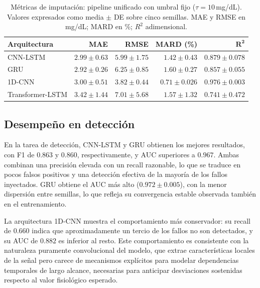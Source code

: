 \documentclass{report}
\begin{document}
\begin{table}[htbp]
\centering
\caption{Métricas de imputación: pipeline unificado con umbral fijo ($\tau = 10$\,mg/dL). Valores expresados como media $\pm$ DE sobre cinco semillas. MAE y RMSE en mg/dL; MARD en \%; $R^2$ adimensional.}
\label{tab:bloque_a_imputacion}
\begin{tabular}{lrrrr}
\toprule
\textbf{Arquitectura} &
\textbf{MAE} & \textbf{RMSE} & \textbf{MARD (\%)} & $\boldsymbol{R^2}$ \\
\midrule
CNN-LSTM         & $2.99 \pm 0.63$ & $5.99 \pm 1.75$ & $1.42 \pm 0.43$
                 & $0.879 \pm 0.078$ \\
GRU              & $2.92 \pm 0.26$ & $6.25 \pm 0.85$ & $1.60 \pm 0.27$
                 & $0.857 \pm 0.055$ \\
1D-CNN           & $3.00 \pm 0.51$ & $3.82 \pm 0.44$ & $0.71 \pm 0.026$
                 & $0.976 \pm 0.003$ \\
Transformer-LSTM & $3.42 \pm 1.44$ & $7.01 \pm 5.68$ & $1.57 \pm 1.32$
                 & $0.741 \pm 0.472$ \\
\bottomrule
\end{tabular}
\end{table}

\subsection*{Desempeño en detección}

En la tarea de detección, CNN-LSTM y GRU obtienen los mejores resultados, con F1 de $0.863$ y $0.860$, respectivamente, y AUC superiores a $0.967$. Ambas combinan una precisión elevada con un recall razonable, lo que se traduce en pocos falsos positivos y una detección efectiva de la mayoría de los fallos inyectados. GRU obtiene el AUC más alto ($0.972 \pm 0.005$), con la menor dispersión entre semillas, lo que refleja su convergencia estable observada también en el entrenamiento.

La arquitectura 1D-CNN muestra el comportamiento más conservador: su recall de $0.660$ indica que aproximadamente un tercio de los fallos no son detectados, y su AUC de $0.882$ es inferior al resto. Este comportamiento es consistente con la naturaleza puramente convolucional del modelo, que extrae características locales de la señal pero carece de mecanismos explícitos para modelar dependencias temporales de largo alcance, necesarias para anticipar desviaciones sostenidas respecto al valor fisiológico esperado.
\end{document}
